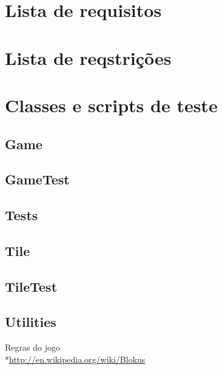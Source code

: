 \documentclass[12pt]{report}
\begin{document}
	\chapter{Lista de requisitos}
		

	\chapter{Lista de reqstrições}
		

	\chapter{Classes e scripts de teste}

		\section{Game}
			
		\section{GameTest}
			
		\section{Tests}
			
		\section{Tile}
			
		\section{TileTest}
			
		\section{Utilities}
			

	\begin{thebibliography}{9}
			Regras do jogo
			\\*\url{http://en.wikipedia.org/wiki/Blokus}
	\end{thebibliography}
\end{document}
